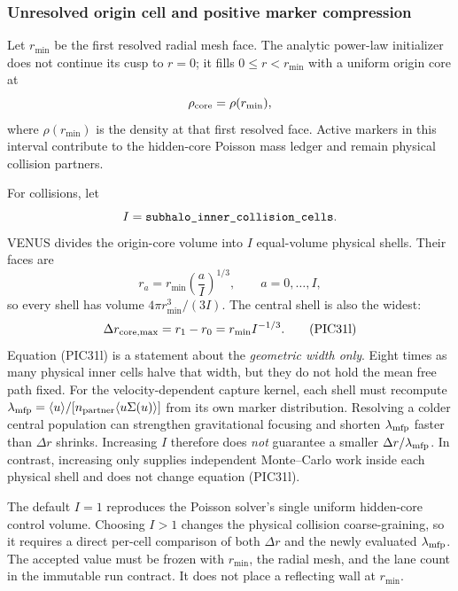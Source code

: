 \subsubsection{Unresolved origin cell and positive marker compression}

Let \(r_{\min}\) be the first resolved radial mesh face.  The analytic
power-law initializer does not continue its cusp to \(r=0\); it fills
\(0\leq r<r_{\min}\) with a uniform origin core at
\[
 \rho_{\rm core}=\rho(r_{\min}),
\]
where \(\rho(r_{\min})\) is the density at that first resolved face.  Active
markers in this interval contribute to the hidden-core Poisson mass ledger and
remain physical collision partners.

For collisions, let
\[
 I=\code{subhalo_inner_collision_cells}.
\]
VENUS divides the origin-core volume into \(I\) equal-volume physical shells.
Their faces are
\[
 r_a=r_{\min}\left(\frac{a}{I}\right)^{1/3},
 \qquad a=0,\ldots,I,                                    \tag{PIC31k}
\]
so every shell has volume \(4\pi r_{\min}^3/(3I)\).  The central shell is also
the widest:
\[
 \Delta r_{\rm core,max}=r_1-r_0
 =r_{\min}I^{-1/3}.                                     \tag{PIC31l}
\]
Equation (PIC31l) is a statement about the \emph{geometric width only}.
Eight times as many physical inner cells halve that width, but they do not
hold the mean free path fixed.  For the velocity-dependent capture kernel,
each shell must recompute
\(\lambda_{\rm mfp}=\langle u\rangle/
[n_{\rm partner}\langle u\Sigma(u)\rangle]\) from its own marker
distribution.  Resolving a colder central population can strengthen
gravitational focusing and shorten \(\lambda_{\rm mfp}\) faster than
\(\Delta r\) shrinks.  Increasing \(I\) therefore does \emph{not} guarantee a
smaller \(\Delta r/\lambda_{\rm mfp}\).  In contrast, increasing
 only supplies independent Monte--Carlo work
inside each physical shell and does not change equation (PIC31l).

The default \(I=1\) reproduces the Poisson solver's single uniform hidden-core
control volume.  Choosing \(I>1\) changes the physical collision
coarse-graining, so it requires a direct per-cell comparison of both
\(\Delta r\) and the newly evaluated \(\lambda_{\rm mfp}\).  The accepted
value must be frozen with \(r_{\min}\), the radial mesh, and the lane count in
the immutable run contract.  It does not place a reflecting wall at
\(r_{\min}\).

